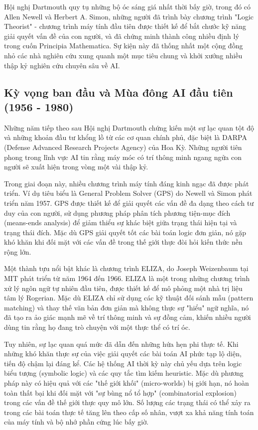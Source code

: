 Hội nghị Dartmouth quy tụ những bộ óc sáng giá nhất thời bấy giờ, trong đó có Allen Newell và Herbert A. Simon, những người đã trình bày chương trình "Logic Theorist" - chương trình máy tính đầu tiên được thiết kế để bắt chước kỹ năng giải quyết vấn đề của con người, và đã chứng minh thành công nhiều định lý trong cuốn Principia Mathematica. Sự kiện này đã thống nhất một cộng đồng nhỏ các nhà nghiên cứu xung quanh một mục tiêu chung và khởi xướng nhiều thập kỷ nghiên cứu chuyên sâu về AI.

\newpage

\subsection{Kỳ vọng ban đầu và Mùa đông AI đầu tiên (1956 - 1980)}

Những năm tiếp theo sau Hội nghị Dartmouth chứng kiến một sự lạc quan tột độ và những khoản đầu tư khổng lồ từ các cơ quan chính phủ, đặc biệt là DARPA (Defense Advanced Research Projects Agency) của Hoa Kỳ. Những người tiên phong trong lĩnh vực AI tin rằng máy móc có trí thông minh ngang ngửa con người sẽ xuất hiện trong vòng một vài thập kỷ.

Trong giai đoạn này, nhiều chương trình máy tính đáng kinh ngạc đã được phát triển. Ví dụ tiêu biểu là General Problem Solver (GPS) do Newell và Simon phát triển năm 1957. GPS được thiết kế để giải quyết các vấn đề đa dạng theo cách tư duy của con người, sử dụng phương pháp phân tích phương tiện-mục đích (means-ends analysis) để giảm thiểu sự khác biệt giữa trạng thái hiện tại và trạng thái đích. Mặc dù GPS giải quyết tốt các bài toán logic đơn giản, nó gặp khó khăn khi đối mặt với các vấn đề trong thế giới thực đòi hỏi kiến thức nền rộng lớn.

Một thành tựu nổi bật khác là chương trình ELIZA, do Joseph Weizenbaum tại MIT phát triển từ năm 1964 đến 1966. ELIZA là một trong những chương trình xử lý ngôn ngữ tự nhiên đầu tiên, được thiết kế để mô phỏng một nhà trị liệu tâm lý Rogerian. Mặc dù ELIZA chỉ sử dụng các kỹ thuật đối sánh mẫu (pattern matching) và thay thế văn bản đơn giản mà không thực sự "hiểu" ngữ nghĩa, nó đã tạo ra ảo giác mạnh mẽ về trí thông minh và sự đồng cảm, khiến nhiều người dùng tin rằng họ đang trò chuyện với một thực thể có trí óc.

Tuy nhiên, sự lạc quan quá mức đã dẫn đến những hứa hẹn phi thực tế. Khi những khó khăn thực sự của việc giải quyết các bài toán AI phức tạp lộ diện, tiến độ chậm lại đáng kể. Các hệ thống AI thời kỳ này chủ yếu dựa trên logic biểu tượng (symbolic logic) và các quy tắc tìm kiếm heuristic. Mặc dù phương pháp này có hiệu quả với các "thế giới khối" (micro-worlds) bị giới hạn, nó hoàn toàn thất bại khi đối mặt với "sự bùng nổ tổ hợp" (combinatorial explosion) trong các vấn đề thế giới thực quy mô lớn. Số lượng các trạng thái có thể xảy ra trong các bài toán thực tế tăng lên theo cấp số nhân, vượt xa khả năng tính toán của máy tính và bộ nhớ phần cứng lúc bấy giờ.

